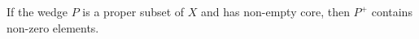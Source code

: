 If the wedge $P$ is a proper subset of $X$ and has non-empty core, then $P^+$ contains non-zero elements.
